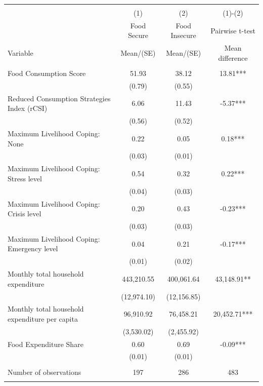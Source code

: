 
\begin{tabular}{@{\extracolsep{5pt}}lccc}
\\[-1.8ex]\hline \hline \\[-1.8ex]
 & \multicolumn{1}{c}{(1)}  & \multicolumn{1}{c}{(2)}  & \multicolumn{1}{c}{(1)-(2)} \\
 & \multicolumn{1}{c}{Food Secure}  & \multicolumn{1}{c}{Food Insecure}  & \multicolumn{1}{c}{Pairwise t-test}  \\
Variable & Mean/(SE) & Mean/(SE) & Mean difference \\ \hline \\[-1.8ex] 
Food Consumption Score   & 51.93    & 38.12    & 13.81***   \\
 & (0.79)  & (0.55)  &  \\ [1ex]
Reduced Consumption Strategies Index (rCSI)   & 6.06    & 11.43    & -5.37***   \\
 & (0.56)  & (0.52)  &  \\ [1ex]
Maximum Livelihood Coping: None   & 0.22    & 0.05    & 0.18***   \\
 & (0.03)  & (0.01)  &  \\ [1ex]
Maximum Livelihood Coping: Stress level   & 0.54    & 0.32    & 0.22***   \\
 & (0.04)  & (0.03)  &  \\ [1ex]
Maximum Livelihood Coping: Crisis level   & 0.20    & 0.43    & -0.23***   \\
 & (0.03)  & (0.03)  &  \\ [1ex]
Maximum Livelihood Coping: Emergency level   & 0.04    & 0.21    & -0.17***   \\
 & (0.01)  & (0.02)  &  \\ [1ex]
Monthly total household expenditure   & 443,210.55    & 400,061.64    & 43,148.91**   \\
 & (12,974.10)  & (12,156.85)  &  \\ [1ex]
Monthly total household expenditure per capita   & 96,910.92    & 76,458.21    & 20,452.71***   \\
 & (3,530.02)  & (2,455.92)  &  \\ [1ex]
Food Expenditure Share   & 0.60    & 0.69    & -0.09***   \\
 & (0.01)  & (0.01)  &  \\ [1ex]
\hline \\[-1.8ex]
Number of observations  & 197   & 286  & 483  \\
\hline \hline \\[-1.8ex]

\end{tabular}

